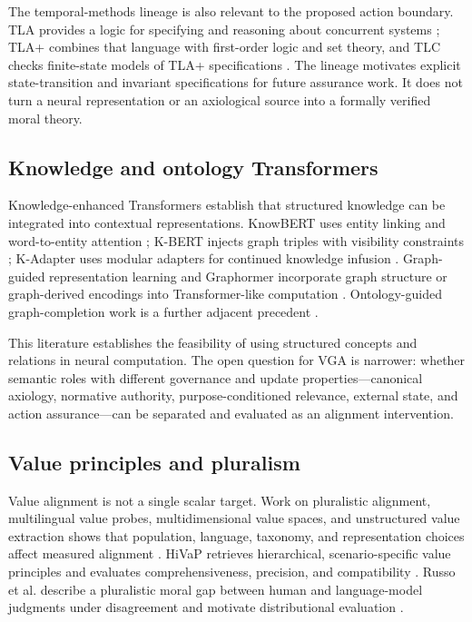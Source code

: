 The temporal-methods lineage is also relevant to the proposed action boundary. TLA provides a logic for specifying and reasoning about concurrent systems \citep{lamport1994tla}; TLA+ combines that language with first-order logic and set theory, and TLC checks finite-state models of TLA+ specifications \citep{yu2003tlaplus}. The lineage motivates explicit state-transition and invariant specifications for future assurance work. It does not turn a neural representation or an axiological source into a formally verified moral theory.

\subsection{Knowledge and ontology Transformers}

Knowledge-enhanced Transformers establish that structured knowledge can be integrated into contextual representations. KnowBERT uses entity linking and word-to-entity attention \citep{peters2019knowbert}; K-BERT injects graph triples with visibility constraints \citep{liu2020kbert}; K-Adapter uses modular adapters for continued knowledge infusion \citep{wang2021kadapter}. Graph-guided representation learning and Graphormer incorporate graph structure or graph-derived encodings into Transformer-like computation \citep{shen2020graphguided,ying2021graphormer}. Ontology-guided graph-completion work is a further adjacent precedent \citep{datak2026ontologykg}.

This literature establishes the feasibility of using structured concepts and relations in neural computation. The open question for VGA is narrower: whether semantic roles with different governance and update properties---canonical axiology, normative authority, purpose-conditioned relevance, external state, and action assurance---can be separated and evaluated as an alignment intervention.

\subsection{Value principles and pluralism}

Value alignment is not a single scalar target. Work on pluralistic alignment, multilingual value probes, multidimensional value spaces, and unstructured value extraction shows that population, language, taxonomy, and representation choices affect measured alignment \citep{sorensen2024pluralistic,xu2024multilingualvalues,yao2024fulcra,padhi2024unstructured}. HiVaP retrieves hierarchical, scenario-specific value principles and evaluates comprehensiveness, precision, and compatibility \citep{xuxi2025valueprinciples}. Russo et al. describe a pluralistic moral gap between human and language-model judgments under disagreement and motivate distributional evaluation \citep{russo2026pluralistic}.


